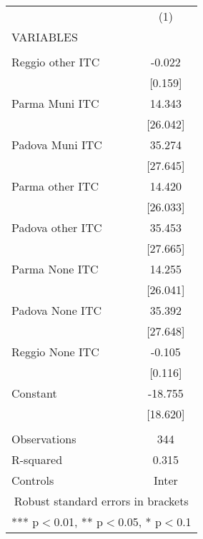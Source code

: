 \begin{tabular}{lc} \hline
 & (1) \\
VARIABLES &  \\ \hline
 &  \\
Reggio other ITC & -0.022 \\
 & [0.159] \\
Parma Muni ITC & 14.343 \\
 & [26.042] \\
Padova Muni ITC & 35.274 \\
 & [27.645] \\
Parma other ITC & 14.420 \\
 & [26.033] \\
Padova other ITC & 35.453 \\
 & [27.665] \\
Parma None ITC & 14.255 \\
 & [26.041] \\
Padova None ITC & 35.392 \\
 & [27.648] \\
Reggio None ITC & -0.105 \\
 & [0.116] \\
Constant & -18.755 \\
 & [18.620] \\
 &  \\
Observations & 344 \\
R-squared & 0.315 \\
 Controls & Inter \\ \hline
\multicolumn{2}{c}{ Robust standard errors in brackets} \\
\multicolumn{2}{c}{ *** p$<$0.01, ** p$<$0.05, * p$<$0.1} \\
\end{tabular}
